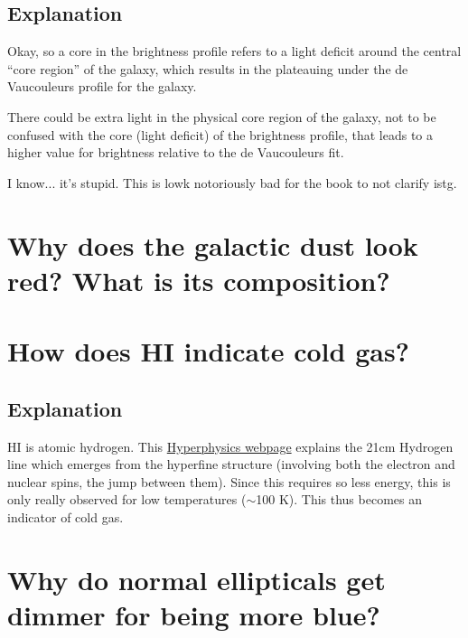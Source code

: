 \documentclass[a4paper,12pt]{article}
\begin{document}
\subsection*{Explanation}
Okay, so a core in the brightness profile refers to a light deficit around the central ``core region'' of the galaxy, which results in the plateauing under the de Vaucouleurs profile for the galaxy.

\vspace{1em}

There could be extra light in the physical core region of the galaxy, not to be confused with the core (light deficit) of the brightness profile, that leads to a higher value for brightness relative to the de Vaucouleurs fit.

\vspace{1em}

I know... it's stupid. This is lowk notoriously bad for the book to not clarify istg.

\section{Why does the galactic dust look red? What is its composition?}


\section{How does H\RN{1} indicate cold gas?}

\subsection*{Explanation}
H\RN{1} is atomic hydrogen. This \href{http://hyperphysics.phy-astr.gsu.edu/hbase/quantum/h21.html#c1}{Hyperphysics webpage} explains the 21cm Hydrogen line which emerges from the hyperfine structure (involving both the electron and nuclear spins, the jump between them). Since this requires so less energy, this is only really observed for low temperatures ($\sim$100 K). This thus becomes an indicator of cold gas.


\section{Why do normal ellipticals get dimmer for being more blue?}
\end{document}
